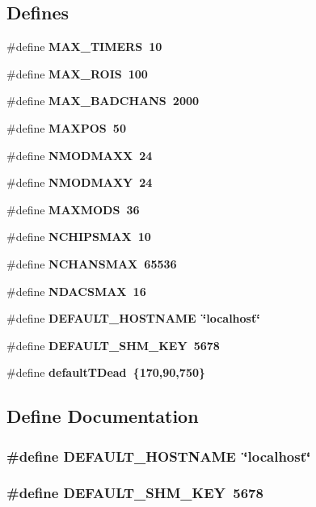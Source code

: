 \subsection*{Defines}
\begin{CompactItemize}
\item 
\#define \bf{MAX\_\-TIMERS}~10
\item 
\#define \bf{MAX\_\-ROIS}~100
\item 
\#define \bf{MAX\_\-BADCHANS}~2000
\item 
\#define \bf{MAXPOS}~50
\item 
\#define \bf{NMODMAXX}~24
\item 
\#define \bf{NMODMAXY}~24
\item 
\#define \bf{MAXMODS}~36
\item 
\#define \bf{NCHIPSMAX}~10
\item 
\#define \bf{NCHANSMAX}~65536
\item 
\#define \bf{NDACSMAX}~16
\item 
\#define \bf{DEFAULT\_\-HOSTNAME}~\char`\"{}localhost\char`\"{}
\item 
\#define \bf{DEFAULT\_\-SHM\_\-KEY}~5678
\item 
\#define \bf{default\-TDead}~\{170,90,750\}
\end{CompactItemize}


\subsection{Define Documentation}
\subsubsection{\setlength{\rightskip}{0pt plus 5cm}\#define DEFAULT\_\-HOSTNAME~\char`\"{}localhost\char`\"{}}\label{slsDetector_8h_cbd0b3def6b58577376d5c5edbc1f8d1}


\subsubsection{\setlength{\rightskip}{0pt plus 5cm}\#define DEFAULT\_\-SHM\_\-KEY~5678}\label{slsDetector_8h_c5cee1b5d2ab5671b3ec6e9ca2bf9fad}


